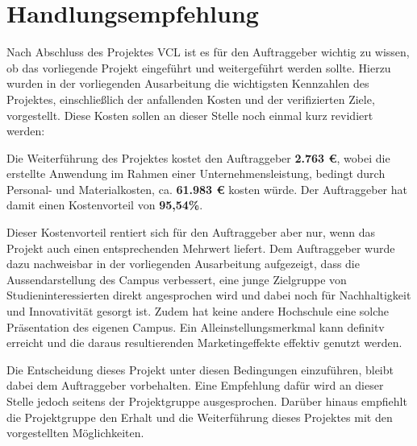 \section{Handlungsempfehlung}
\label{sec:Handlungsempfehlung}

Nach Abschluss des Projektes \ac{VCL} ist es für den Auftraggeber wichtig zu wissen,
ob das vorliegende Projekt eingeführt und weitergeführt werden sollte.
Hierzu wurden in der vorliegenden Ausarbeitung die wichtigsten Kennzahlen des Projektes,
einschließlich der anfallenden Kosten und der verifizierten Ziele, vorgestellt.
Diese Kosten sollen an dieser Stelle noch einmal kurz revidiert werden:

Die Weiterführung des Projektes kostet den Auftraggeber \textbf{2.763 €}, wobei
die erstellte Anwendung im Rahmen einer Unternehmensleistung, bedingt
durch Personal- und Materialkosten, ca. \textbf{61.983 €} kosten würde.
Der Auftraggeber hat damit einen Kostenvorteil von \textbf{95,54\%}.

Dieser Kostenvorteil rentiert sich für den Auftraggeber aber nur, wenn
das Projekt auch einen entsprechenden Mehrwert liefert.
Dem Auftraggeber wurde dazu nachweisbar in der vorliegenden Ausarbeitung aufgezeigt,
dass die Aussendarstellung des Campus verbessert, eine junge Zielgruppe
von Studieninteressierten direkt angesprochen wird und dabei noch für
Nachhaltigkeit und Innovativität gesorgt ist. Zudem hat keine andere
Hochschule eine solche Präsentation des eigenen Campus. Ein Alleinstellungsmerkmal
kann definitv erreicht und die daraus resultierenden Marketingeffekte effektiv genutzt werden.

Die Entscheidung dieses Projekt unter diesen Bedingungen einzuführen,
bleibt dabei dem Auftraggeber vorbehalten. Eine Empfehlung dafür wird an dieser
Stelle jedoch seitens der Projektgruppe ausgesprochen. Darüber hinaus empfiehlt die
Projektgruppe  den Erhalt und die Weiterführung dieses Projektes mit den vorgestellten Möglichkeiten.